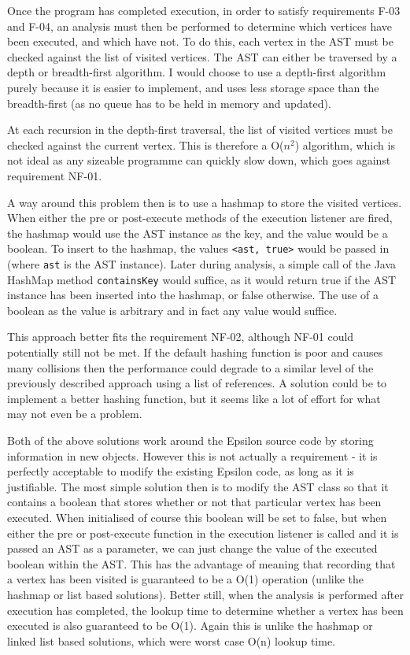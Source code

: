 Once the program has completed execution, in order to satisfy requirements F-03 and F-04, an analysis must then be performed to determine which vertices have been executed, and which have not. To do this, each vertex in the AST must be checked against the list of visited vertices. The AST can either be traversed by a depth or breadth-first algorithm. I would choose to use a depth-first algorithm purely because it is easier to implement, and uses less storage space than the breadth-first (as no queue has to be held in memory and updated).

At each recursion in the depth-first traversal, the list of visited vertices must be checked against the current vertex. This is therefore a O($n^2$) algorithm, which is not ideal as any sizeable programme can quickly slow down, which goes against requirement NF-01. 

A way around this problem then is to use a hashmap to store the visited vertices. When either the pre or post-execute methods of the execution listener are fired, the hashmap would use the AST instance as the key, and the value would be a boolean. To insert to the hashmap, the values \verb|<ast, true>| would be passed in (where \verb|ast| is the AST instance). Later during analysis, a simple call of the Java HashMap method \verb|containsKey| would suffice, as it would return true if the AST instance has been inserted into the hashmap, or false otherwise. The use of a boolean as the value is arbitrary and in fact any value would suffice. 

This approach better fits the requirement NF-02, although NF-01 could potentially still not be met. If the default hashing function is poor and causes many collisions then the performance could degrade to a similar level of the previously described approach using a list of references. A solution could be to implement a better hashing function, but it seems like a lot of effort for what may not even be a problem.

Both of the above solutions work around the Epsilon source code by storing information in new objects. However this is not actually a requirement - it is perfectly acceptable to modify the existing Epsilon code, as long as it is justifiable. The most simple solution then is to modify the AST class so that it contains a boolean that stores whether or not that particular vertex has been executed. When initialised of course this boolean will be set to false, but when either the pre or post-execute function in the execution listener is called and it is passed an AST as a parameter, we can just change the value of the executed boolean within the AST. This has the advantage of meaning that recording that a vertex has been visited is guaranteed to be a O(1) operation (unlike the hashmap or list based solutions). Better still, when the analysis is performed after execution has completed, the lookup time to determine whether a vertex has been executed is also guaranteed to be O(1). Again this is unlike the hashmap or linked list based solutions, which were worst case O(n) lookup time.

